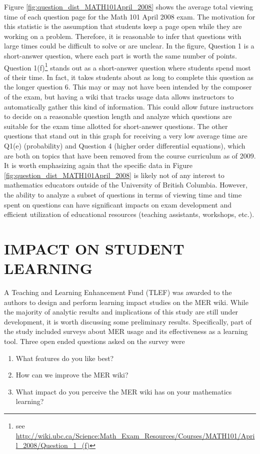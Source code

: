 \documentclass{primus}
\begin{document}
\noindent{}Figure \ref{fig:question_dist_MATH101April_2008} shows the average total viewing time of each question page for the Math 101 April 2008 exam. The motivation for this statistic is the assumption that students keep a page open while they are working on a problem. Therefore, it is reasonable to infer that questions with large times could be difficult to solve or are unclear. In the figure, Question 1 is a short-answer question, where each part is worth the same number of points. Question 1(f)\footnote{see \url{http://wiki.ubc.ca/Science:Math_Exam_Resources/Courses/MATH101/April_2008/Question_1_(f)}} stands out as a short-answer question where students spend most of their time. In fact, it takes students about as long to complete this question as the longer question 6. This may or may not have been intended by the composer of the exam, but having a wiki that tracks usage data allows instructors to automatically gather this kind of information. This could allow future instructors to decide on a reasonable question length and analyze which questions are suitable for the exam time allotted for short-answer questions. The other questions that stand out in this graph for receiving a very low average time are Q1(e) (probability) and Question 4 (higher order differential equations), which are both on topics that have been removed from the course curriculum as of 2009. It is worth emphasizing again that the specific data in Figure \ref{fig:question_dist_MATH101April_2008} is likely not of any interest to mathematics educators outside of the University of British Columbia. However, the ability to analyze a subset of questions in terms of viewing time and time spent on questions can have significant impacts on exam development and efficient utilization of educational resources (teaching assistants, workshops, etc.).

\section{IMPACT ON STUDENT LEARNING}
A Teaching and Learning Enhancement Fund (TLEF) was awarded to the authors to design and perform learning impact studies on the MER wiki. While the majority of analytic results and implications of this study are still under development, it is worth discussing some preliminary results. Specifically, part of the study included surveys about MER usage and its effectiveness as a learning tool. Three open ended questions asked on the survey were

\begin{enumerate}
\item What features do you like best?
\item How can we improve the MER wiki?
\item What impact do you perceive the MER wiki has on your mathematics learning?
\end{enumerate}
\end{document}
